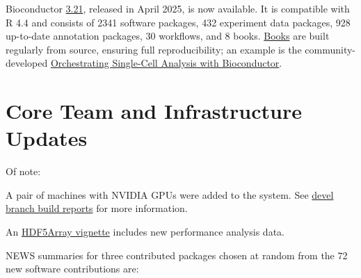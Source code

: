 Bioconductor \href{https://bioconductor.org/news/bioc_3_21_release/}{3.21}, released in April 2025, is now available. It is
compatible with R 4.4 and consists of 2341 software packages, 432
experiment data packages, 928 up-to-date annotation packages, 30
workflows, and 8 books. \href{https://bioconductor.org/books/release/}{Books} are
built regularly from source, ensuring full reproducibility; an example is the
community-developed \href{https://bioconductor.org/books/release/OSCA/}{Orchestrating Single-Cell Analysis with Bioconductor}.

\section{Core Team and Infrastructure Updates}\label{core-team-and-infrastructure-updates}

Of note:

A pair of machines with NVIDIA GPUs were added to the system. See
\href{https://bioconductor.org/checkResults/3.22/bioc-gpu-LATEST/}{devel branch build reports} for
more information.

An \href{https://bioconductor.org/packages/release/bioc/vignettes/HDF5Array/inst/doc/HDF5Array_performance.html}{HDF5Array vignette} includes new performance analysis data.

NEWS summaries for three contributed packages chosen at random from the 72 new software contributions are:

